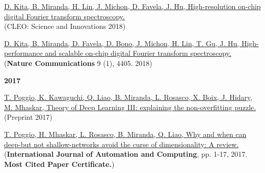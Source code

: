 \documentclass{article}
\newenvironment{changemargin}[2]{%
  \begin{list}{}{%
    \setlength{\topsep}{0pt}%
    \setlength{\leftmargin}{#1}%
    \setlength{\rightmargin}{#2}%
    \setlength{\listparindent}{\parindent}%
    \setlength{\itemindent}{\parindent}%
    \setlength{\parsep}{\parskip}%
  }%
  \item[]}{\end{list}
}
\newenvironment{body} {
	\vspace*{-16pt}
	\begin{changemargin}{-0.25in}{-0.5in}
  }	
	{\end{changemargin}
}
\begin{document}
\begin{body}
    \vspace{10pt}
    \href{https://www.osapublishing.org/abstract.cfm?uri=CLEO_SI-2018-SF1A.1}
    {D. Kita, B. Miranda, H. Lin, J. Michon, D. Favela, J. Hu,
    High-resolution on-chip digital Fourier transform spectroscopy.}
    \\
    (CLEO: Science and Innovations 2018)

    \vspace{10pt}
    \href{https://www.nature.com/articles/s41467-018-06773-2}
    {D. Kita, B. Miranda, D. Favela, D. Bono, J. Michon, H. Lin, T. Gu, J. Hu,
    High-performance and scalable on-chip digital Fourier transform spectroscopy.}
    \\
    (\textbf{Nature Communications} 9 (1), 4405. 2018)

    \vspace{12pt}
    \textbf{\large 2017}
    \vspace{4pt}

    \vspace{10pt}
    \href{https://arxiv.org/abs/1801.00173}
    {T. Poggio, K. Kawaguchi, Q. Liao, B. Miranda, L. Rosasco, X. Boix, J. Hidary, M. Mhaskar,
    Theory of Deep Learning III: explaining the non-overfitting puzzle.}
    \\
    (Preprint 2017)

    \vspace{10pt}
    \href{https://link.springer.com/article/10.1007/s11633-017-1054-2}
    {T. Poggio, H. Mhaskar, L. Rosasco, B. Miranda, Q. Liao,
    Why and when can deep-but not shallow-networks avoid the curse of dimensionality: A review.}
    \\
    (\textbf{International Journal of Automation and Computing}, pp. 1-17, 2017. \textbf{Most Cited Paper Certificate.})

    \vspace{4pt}
\end{body}

\newpage

\end{document}
